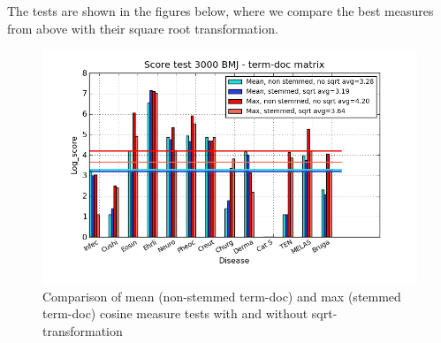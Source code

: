The tests are shown in the figures below, where we compare the best measures from above 
with their square root transformation.

\begin{figure}[H]
  \caption{Comparison of mean (non-stemmed term-doc) and max (stemmed term-doc) cosine measure tests with and without sqrt-transformation}
  \begin{center}
    \includegraphics[width=1.2\textwidth]{barcharts/termDoc_bmj_hist_3000_ns_mea_ns_mea_sqr_s_max_s_max_sqr.png}
  \end{center}
  \label{termDoc_bmj_hist_3000_ns_mea_ns_mea_sqr_s_max_s_max_sqr}
\end{figure}

